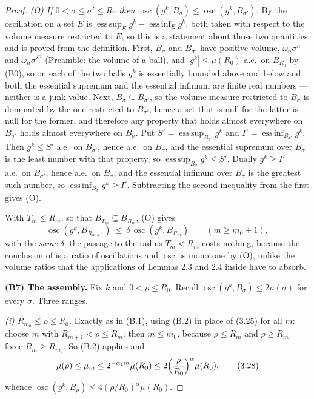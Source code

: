 \begin{proof}
\emph{(O) If $0<\sigma\le\sigma'\le R_0$ then
$\operatorname*{osc}(g^k,B_\sigma)\le\operatorname*{osc}(g^k,B_{\sigma'})$.}
By  the oscillation on a set $E$ is
$\operatorname{ess\,sup}_Eg^k-\operatorname{ess\,inf}_Eg^k$, both taken with
respect to the volume measure restricted to $E$, so this is a statement about
those two quantities and is proved from the definition.  First, $B_\sigma$ and
$B_{\sigma'}$ have positive volume, $\omega_n\sigma^n$ and $\omega_n\sigma'^n$
(Preamble: the volume of a ball), and $|g^k|\le\mu(R_0)$ a.e.\ on $B_{R_0}$ by
(B0), so on each of the two balls $g^k$ is essentially bounded above and below
and both the essential supremum and the essential infimum are finite real
numbers --- neither is a junk value.  Next, $B_\sigma\subseteq B_{\sigma'}$, so
the volume measure restricted to $B_\sigma$ is dominated by the one restricted to
$B_{\sigma'}$; hence a set that is null for the latter is null for the former,
and therefore any property that holds almost everywhere on $B_{\sigma'}$ holds
almost everywhere on $B_\sigma$.  Put
$S'=\operatorname{ess\,sup}_{B_{\sigma'}}g^k$ and
$I'=\operatorname{ess\,inf}_{B_{\sigma'}}g^k$.  Then $g^k\le S'$ a.e.\ on
$B_{\sigma'}$, hence a.e.\ on $B_\sigma$, and the essential supremum over
$B_\sigma$ is the least number with that property, so
$\operatorname{ess\,sup}_{B_\sigma}g^k\le S'$.  Dually $g^k\ge I'$ a.e.\ on
$B_{\sigma'}$, hence a.e.\ on $B_\sigma$, and the essential infimum over
$B_\sigma$ is the greatest such number, so
$\operatorname{ess\,inf}_{B_\sigma}g^k\ge I'$.  Subtracting the second
inequality from the first gives (O).

With $T_m\le R_m$, so that $B_{T_m}\subseteq B_{R_m}$, (O) gives
\[
\operatorname*{osc}(g^k,B_{R_{m+1}})\ \le\ \delta\,\operatorname*{osc}(g^k,B_{R_m})
\qquad(m\ge m_0+1),
\tag{3.27}
\]
with the \emph{same} $\delta$: the passage to the radius $T_m<R_m$ costs nothing,
because the conclusion of  is a ratio of
oscillations and $\operatorname*{osc}$ is monotone by (O), unlike the volume ratios
that the applications of Lemmas 2.3 and 2.4 inside
 have to absorb.

\textbf{(B7) The assembly.}  Fix $k$ and $0<\rho\le R_0$.  Recall
$\operatorname*{osc}(g^k,B_\sigma)\le2\mu(\sigma)$ for every $\sigma$.  Three
ranges.

\emph{(i) $R_{m_0}\le\rho\le R_0$.}  Exactly as in (B.1), using (B.2) in place
of (3.25) for all $m$: choose $m$ with $R_{m+1}<\rho\le R_m$; then $m\le m_0$,
because $\rho\le R_m$ and $\rho\ge R_{m_0}$ force $R_m\ge R_{m_0}$.  So
(B.2) applies and
\[
\mu(\rho)\le\mu_m\le2^{-\alpha_1m}\mu(R_0)\le2\Bigl(\frac\rho{R_0}\Bigr)^{\alpha}\mu(R_0),
\tag{3.28}
\]
whence $\operatorname*{osc}(g^k,B_\rho)\le4(\rho/R_0)^{\alpha}\mu(R_0)$.


\end{proof}
